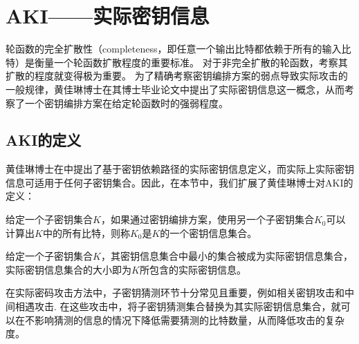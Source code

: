 
\chapter{AKI——实际密钥信息}
\label{chap:AKI}
轮函数的完全扩散性（completeness，即任意一个输出比特都依赖于所有的输入比特）是衡量一个轮函数扩散程度的重要标准。
对于非完全扩散的轮函数，考察其扩散的程度就变得极为重要。
为了精确考察密钥编排方案的弱点导致实际攻击的一般规律，黄佳琳博士在其博士毕业论文中提出了实际密钥信息这一概念，从而考察了一个密钥编排方案在给定轮函数时的强弱程度。
\section{AKI的定义}
黄佳琳博士在中提出了基于密钥依赖路径的实际密钥信息定义，而实际上实际密钥信息可适用于任何子密钥集合。因此，在本节中，我们扩展了黄佳琳博士对AKI的定义：
\begin{defn}[密钥信息集合]
    给定一个子密钥集合$K$，如果通过密钥编排方案，使用另一个子密钥集合$K_0$可以计算出$K$中的所有比特，则称$K_0$是$K$的一个密钥信息集合。
\end{defn}
\begin{defn}[实际密钥信息]
    给定一个子密钥集合$K$，其密钥信息集合中最小的集合被成为实际密钥信息集合，实际密钥信息集合的大小即为$K$所包含的实际密钥信息。
\end{defn}
在实际密码攻击方法中，子密钥猜测环节十分常见且重要，例如相关密钥攻击和中间相遇攻击.
在这些攻击中，将子密钥猜测集合替换为其实际密钥信息集合，就可以在不影响猜测的信息的情况下降低需要猜测的比特数量，从而降低攻击的复杂度。
